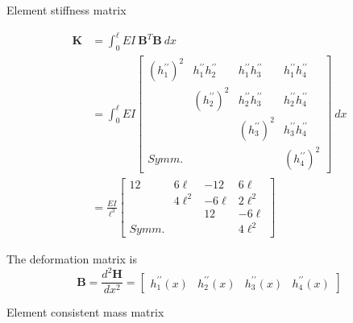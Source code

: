 \documentclass[aspectratio=169]{beamer}
\begin{document}
{
\color{white}
\begin{frame}{Element stiffness matrix}
  \vspace{-0.5cm}

  \begin{align*}
    \mathbf{K} & =\int_0^{\ell}  EI\ \mathbf{B}^T\mathbf{B}\ dx                                                                                                                                                                                                                                                                \\
               & =\int_0^{\ell} EI \begin{bmatrix} (h_1^{\prime\prime})^2 & h_1^{\prime\prime} h_2^{\prime\prime} & h_1^{\prime\prime} h_3^{\prime\prime} & h_1^{\prime\prime} h_4^{\prime\prime} \\
                                       & (h_2^{\prime\prime})^2                & h_2^{\prime\prime} h_3^{\prime\prime} & h_2^{\prime\prime} h_4^{\prime\prime} \\ & & (h_3^{\prime\prime})^2                & h_3^{\prime\prime} h_4^{\prime\prime} \\ Symm. & & & (h_4^{\prime\prime})^2\end{bmatrix} \ dx \\[5pt]
               & =\frac{EI}{\ell^3} \begin{bmatrix} 12 & 6\ell & -12 & 6\ell \\  & 4\ell^2 & -6\ell & 2\ell^2\\ & &12 & -6\ell \\Symm. & & & 4\ell^2 \end{bmatrix}
  \end{align*}

  The deformation matrix is
  $$\mathbf B=\frac{d^2 \mathbf H}{dx^2}=\begin{bmatrix} h_1^{\prime\prime}(x) & h_2^{\prime\prime}(x) & h_3^{\prime\prime}(x) & h_4^{\prime\prime}(x) \end{bmatrix}$$
\end{frame}

\begin{frame}{Element consistent mass matrix}
  \vspace{-0.5cm}


\end{frame}}
\end{document}
